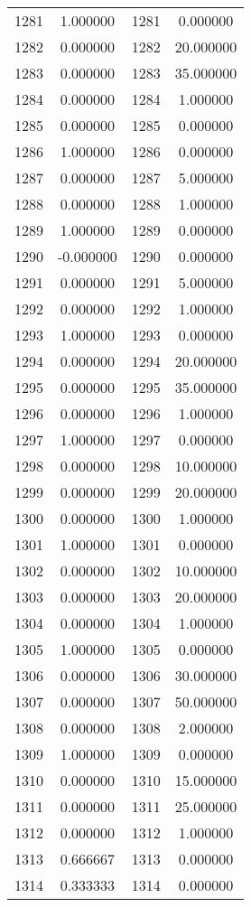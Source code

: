 \documentclass[12pt]{article}
\begin{document}
\begin{longtable}{@{}cccc@{}}
1281 & 1.000000 & 1281 & 0.000000 \\
1282 & 0.000000 & 1282 & 20.000000 \\
1283 & 0.000000 & 1283 & 35.000000 \\
1284 & 0.000000 & 1284 & 1.000000 \\
1285 & 0.000000 & 1285 & 0.000000 \\
1286 & 1.000000 & 1286 & 0.000000 \\
1287 & 0.000000 & 1287 & 5.000000 \\
1288 & 0.000000 & 1288 & 1.000000 \\
1289 & 1.000000 & 1289 & 0.000000 \\
1290 & -0.000000 & 1290 & 0.000000 \\
1291 & 0.000000 & 1291 & 5.000000 \\
1292 & 0.000000 & 1292 & 1.000000 \\
1293 & 1.000000 & 1293 & 0.000000 \\
1294 & 0.000000 & 1294 & 20.000000 \\
1295 & 0.000000 & 1295 & 35.000000 \\
1296 & 0.000000 & 1296 & 1.000000 \\
1297 & 1.000000 & 1297 & 0.000000 \\
1298 & 0.000000 & 1298 & 10.000000 \\
1299 & 0.000000 & 1299 & 20.000000 \\
1300 & 0.000000 & 1300 & 1.000000 \\
1301 & 1.000000 & 1301 & 0.000000 \\
1302 & 0.000000 & 1302 & 10.000000 \\
1303 & 0.000000 & 1303 & 20.000000 \\
1304 & 0.000000 & 1304 & 1.000000 \\
1305 & 1.000000 & 1305 & 0.000000 \\
1306 & 0.000000 & 1306 & 30.000000 \\
1307 & 0.000000 & 1307 & 50.000000 \\
1308 & 0.000000 & 1308 & 2.000000 \\
1309 & 1.000000 & 1309 & 0.000000 \\
1310 & 0.000000 & 1310 & 15.000000 \\
1311 & 0.000000 & 1311 & 25.000000 \\
1312 & 0.000000 & 1312 & 1.000000 \\
1313 & 0.666667 & 1313 & 0.000000 \\
1314 & 0.333333 & 1314 & 0.000000 \\

\end{longtable}
\end{document}
